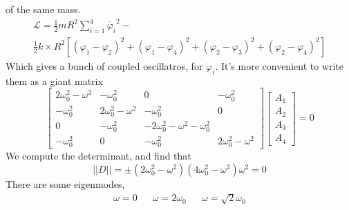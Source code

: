 \documentclass{article} \usepackage{amsmath} \usepackage{amssymb} \usepackage{amsthm} \usepackage[margin=0.2in]{geometry} \usepackage{hyperref} \usepackage{physics} \usepackage{tikz} \usepackage{mathtools} \mathtoolsset{showonlyrefs} \theoremstyle{definition} \newtheorem{theorem}{Theorem}[section] \newtheorem{corollary}{Corollary}[theorem] \newtheorem{lemma}[theorem]{Lemma} \newtheorem{definition}{Definition}[section] \author{Connor Duncan} \date{\today}
\begin{document}
of the same mass. \begin{align} \mathcal L=\frac{1}{2}mR^2\sum_{i=1}^4\dot{\varphi_i}^2-\\ \frac{1}{2}k\times R^2\left[(\varphi_1-\varphi_2)^2+(\varphi_1-\varphi_4)^2+(\varphi_2-\varphi_3)^2+(\varphi_2-\varphi_4)^2\right] \end{align} Which gives a bunch of coupled oscillatros, for $\ddot\varphi _i$. It's more convenient to write them as a giant matrix \begin{equation} \begin{bmatrix} 2\omega_0^2-\omega^2 & -\omega_0^2 & 0 & -\omega_0^2\\ -\omega_0^2 & 2\omega_0^2-\omega^2 & -\omega_0^2 & 0\\ 0 & -\omega_0^2 & -2\omega_0^2-\omega^2 -\omega_0^2 \\ -\omega_0^2 & 0 & -\omega_0^2 & 2\omega_0^2-\omega^2 \end{bmatrix} \begin{bmatrix} A_1\\A_2\\A_3\\A_4 \end{bmatrix}=0 \end{equation} We compute the determinant, and find that \begin{equation} ||D||=\pm(2\omega_0^2-\omega^2)(4\omega_0^2-\omega^2)\omega^2=0 \end{equation} There are some eigenmodes, \begin{align} \omega=0 && \omega=2\omega_0 && \omega=\sqrt{2}\omega_0 \end{align}
\end{document}
